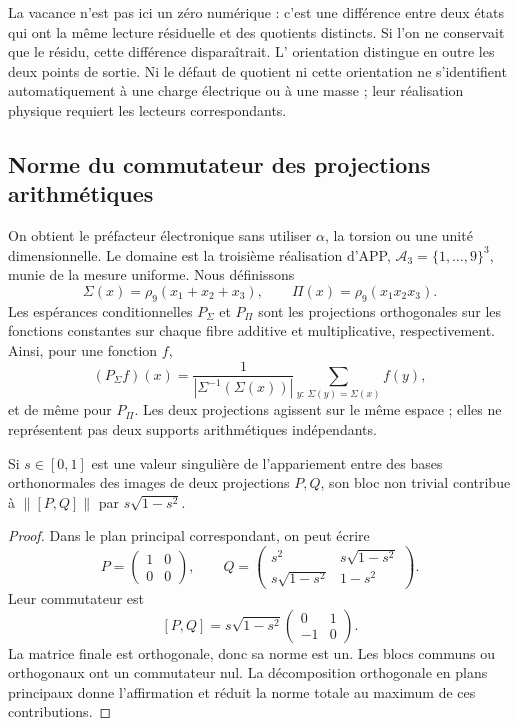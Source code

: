 La vacance n'est pas ici un zéro numérique : c'est une différence entre deux
états qui ont la même lecture résiduelle et des quotients distincts. Si l'on
ne conservait que le résidu, cette différence disparaîtrait. L'
orientation distingue en outre les deux points de sortie. Ni le défaut de
quotient ni cette orientation ne s'identifient automatiquement à une charge
électrique ou à une masse ; leur réalisation physique requiert les lecteurs
correspondants.



\subsection{Norme du commutateur des projections arithmétiques}

On obtient le préfacteur électronique sans utiliser \(\alpha\), la torsion ou une unité dimensionnelle. Le domaine est la troisième réalisation d'APP, \(\mathcal A_3=\{1,\ldots,9\}^3\), munie de la mesure uniforme. Nous définissons
\[
 \Sigma(x)=\rho_9(x_1+x_2+x_3),\qquad
 \Pi(x)=\rho_9(x_1x_2x_3).
\]
Les espérances conditionnelles \(P_\Sigma\) et \(P_\Pi\) sont les
projections orthogonales sur les fonctions constantes sur chaque fibre
additive et multiplicative, respectivement. Ainsi, pour une fonction \(f\),
\[
 (P_\Sigma f)(x)
 =\frac{1}{|\Sigma^{-1}(\Sigma(x))|}
   \sum_{y:\,\Sigma(y)=\Sigma(x)}f(y),
\]
et de même pour \(P_\Pi\). Les deux projections agissent sur le même espace ; elles ne représentent pas deux supports arithmétiques indépendants.

\begin{lemma}
Si \(s\in[0,1]\) est une valeur singulière de l'appariement entre des bases
orthonormales des images de deux projections \(P,Q\), son bloc non
trivial contribue à \(\|[P,Q]\|\) par
\(s\sqrt{1-s^2}\).
\end{lemma}
\begin{proof}
Dans le plan principal correspondant, on peut écrire
\[
 P=\begin{pmatrix}1&0\\0&0\end{pmatrix},\qquad
 Q=\begin{pmatrix}
 s^2&s\sqrt{1-s^2}\\
 s\sqrt{1-s^2}&1-s^2
 \end{pmatrix}.
\]
Leur commutateur est
\[
 [P,Q]=s\sqrt{1-s^2}
 \begin{pmatrix}0&1\\-1&0\end{pmatrix}.
\]
La matrice finale est orthogonale, donc sa norme est un. Les blocs communs ou orthogonaux ont un commutateur nul. La décomposition orthogonale en plans principaux donne l'affirmation et réduit la norme totale au maximum de ces contributions.
\end{proof}

